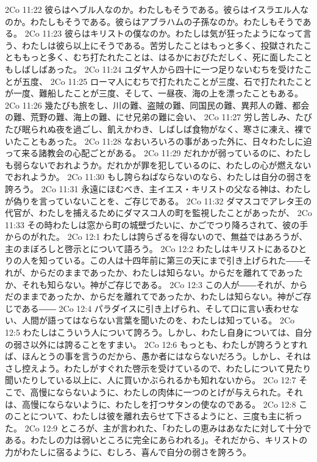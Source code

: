 2Co 11:22  彼らはヘブル人なのか。わたしもそうである。彼らはイスラエル人なのか。わたしもそうである。彼らはアブラハムの子孫なのか。わたしもそうである。
2Co 11:23  彼らはキリストの僕なのか。わたしは気が狂ったようになって言う、わたしは彼ら以上にそうである。苦労したことはもっと多く、投獄されたことももっと多く、むち打たれたことは、はるかにおびただしく、死に面したこともしばしばあった。
2Co 11:24  ユダヤ人から四十に一つ足りないむちを受けたことが五度、
2Co 11:25  ローマ人にむちで打たれたことが三度、石で打たれたことが一度、難船したことが三度、そして、一昼夜、海の上を漂ったこともある。
2Co 11:26  幾たびも旅をし、川の難、盗賊の難、同国民の難、異邦人の難、都会の難、荒野の難、海上の難、にせ兄弟の難に会い、
2Co 11:27  労し苦しみ、たびたび眠られぬ夜を過ごし、飢えかわき、しばしば食物がなく、寒さに凍え、裸でいたこともあった。
2Co 11:28  なおいろいろの事があった外に、日々わたしに迫って来る諸教会の心配ごとがある。
2Co 11:29  だれかが弱っているのに、わたしも弱らないでおれようか。だれかが罪を犯しているのに、わたしの心が燃えないでおれようか。
2Co 11:30  もし誇らねばならないのなら、わたしは自分の弱さを誇ろう。
2Co 11:31  永遠にほむべき、主イエス・キリストの父なる神は、わたしが偽りを言っていないことを、ご存じである。
2Co 11:32  ダマスコでアレタ王の代官が、わたしを捕えるためにダマスコ人の町を監視したことがあったが、
2Co 11:33  その時わたしは窓から町の城壁づたいに、かごでつり降ろされて、彼の手からのがれた。
2Co 12:1  わたしは誇らざるを得ないので、無益ではあろうが、主のまぼろしと啓示とについて語ろう。
2Co 12:2  わたしはキリストにあるひとりの人を知っている。この人は十四年前に第三の天にまで引き上げられた――それが、からだのままであったか、わたしは知らない。からだを離れてであったか、それも知らない。神がご存じである。
2Co 12:3  この人が――それが、からだのままであったか、からだを離れてであったか、わたしは知らない。神がご存じである――
2Co 12:4  パラダイスに引き上げられ、そして口に言い表わせない、人間が語ってはならない言葉を聞いたのを、わたしは知っている。
2Co 12:5  わたしはこういう人について誇ろう。しかし、わたし自身については、自分の弱さ以外には誇ることをすまい。
2Co 12:6  もっとも、わたしが誇ろうとすれば、ほんとうの事を言うのだから、愚か者にはならないだろう。しかし、それはさし控えよう。わたしがすぐれた啓示を受けているので、わたしについて見たり聞いたりしている以上に、人に買いかぶられるかも知れないから。
2Co 12:7  そこで、高慢にならないように、わたしの肉体に一つのとげが与えられた。それは、高慢にならないように、わたしを打つサタンの使なのである。
2Co 12:8  このことについて、わたしは彼を離れ去らせて下さるようにと、三度も主に祈った。
2Co 12:9  ところが、主が言われた、「わたしの恵みはあなたに対して十分である。わたしの力は弱いところに完全にあらわれる」。それだから、キリストの力がわたしに宿るように、むしろ、喜んで自分の弱さを誇ろう。
